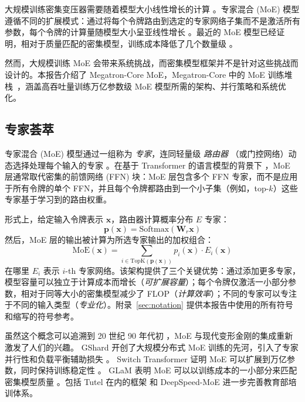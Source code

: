 大规模训练密集变压器需要随着模型大小线性增长的计算 \cite{kaplan2020scaling,hoffmann2022chinchilla}。专家混合 (MoE) 模型遵循不同的扩展模式：通过将每个令牌路由到选定的专家网络子集而不是激活所有参数，每个令牌的计算量随模型大小呈亚线性增长 \cite{shazeer2017,fedus2022switchtransformersscalingtrillion}。最近的 MoE 模型已经证明，相对于质量匹配的密集模型，训练成本降低了几个数量级 \cite{jiang2024mixtralexperts,deepseekai2025deepseekv3technicalreport,Cai_2025}。

然而，大规模训练 MoE 会带来系统挑战，而密集模型框架并不是针对这些挑战而设计的。本报告介绍了 Megatron-Core MoE，Megatron-Core 中的 MoE 训练堆栈~\cite{shoeybi2020megatronlmtrainingmultibillionparameter}，涵盖高吞吐量训练万亿参数级 MoE 模型所需的架构、并行策略和系统优化。

\subsection{专家荟萃}

专家混合 (MoE) 模型通过一组称为 \emph{专家}，连同轻量级 \emph{路由器} （或门控网络）动态选择处理每个输入的专家 \cite{shazeer2017,jacobs1991adaptive,eigen2013learning}。在基于 Transformer 的语言模型的背景下 \cite{vaswani2017attention}，MoE 层通常取代密集的前馈网络 (FFN) 块：MoE 层包含多个 FFN 专家，而不是应用于所有令牌的单个 FFN，并且每个令牌都路由到一个小子集（例如，top-$k$）这些专家基于学习到的路由权重。

形式上，给定输入令牌表示 $\mathbf{x}$，路由器计算概率分布 $E$ 专家：
\[
\mathbf{p}(\mathbf{x}) = \text{Softmax}(\mathbf{W}_r \mathbf{x})
\]
然后，MoE 层的输出被计算为所选专家输出的加权组合：
\[
\text{MoE}(\mathbf{x}) = \sum_{i \in \text{TopK}(\mathbf{p}(\mathbf{x}))} p_i(\mathbf{x}) \cdot E_i(\mathbf{x})
\]
在哪里 $E_i$ 表示 $i$-th 专家网络。该架构提供了三个关键优势：通过添加更多专家，模型容量可以独立于计算成本而增长（\emph{可扩展容量}）；每个令牌仅激活一小部分参数，相对于同等大小的密集模型减少了 FLOP（\emph{计算效率}）；不同的专家可以专注于不同的输入类型（\emph{专业化}）。附录~\ref{sec:notation} 提供本报告中使用的所有符号和缩写的符号参考。

虽然这个概念可以追溯到 20 世纪 90 年代初 \cite{jacobs1991adaptive,eigen2013learning}，MoE 与现代变形金刚的集成重新激发了人们的兴趣。 GShard 开创了大规模分布式 MoE 训练的先河，引入了专家并行性和负载平衡辅助损失 \cite{lepikhin2020gshard}。 Switch Transformer 证明 MoE 可以扩展到万亿参数，同时保持训练稳定性 \cite{fedus2022switchtransformersscalingtrillion}。 GLaM 表明 MoE 可以以训练成本的一小部分来匹配密集模型质量 \cite{du2022glamefficientscalinglanguage}。包括 Tutel 在内的框架 \cite{hwang2023tutel} 和 DeepSpeed-MoE \cite{rajbhandari2022deepspeedmoe} 进一步完善教育部培训体系。

